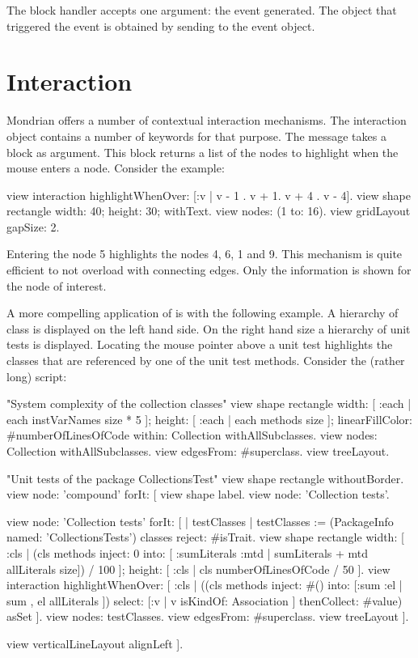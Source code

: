 \documentclass[a4paper,10pt,twoside]{book}
\begin{document}
The block handler accepts one argument: the event generated. The object that triggered the event is obtained by sending  to the event object. 


\section{Interaction}
Mondrian offers a number of contextual interaction mechanisms. The interaction object contains a number of keywords for that purpose. The message  takes a block as argument. This block returns a list of the nodes to highlight when the mouse enters a node. Consider the example:

\begin{code}{}
view interaction 
  highlightWhenOver: [:v | {v - 1 . v + 1. v + 4 . v - 4}].
view shape rectangle 
  width: 40;
  height: 30;
  withText.
view nodes: (1 to: 16).
view gridLayout gapSize: 2.
\end{code}

Entering the node 5 highlights the nodes 4, 6, 1 and 9. This mechanism is quite efficient to not overload with connecting edges. Only the information is shown for the node of interest. 

A more compelling application of  is with the following example. A hierarchy of class is displayed on the left hand side. On the right hand size a hierarchy of unit tests is displayed. Locating the mouse pointer above a unit test highlights the classes that are referenced by one of the unit test methods. Consider the (rather long) script:

\begin{code}{}
"System complexity of the collection classes"
view shape rectangle
  width: [ :each | each instVarNames size * 5 ];
  height: [ :each | each methods size ];
  linearFillColor: #numberOfLinesOfCode within: Collection withAllSubclasses.
view nodes: Collection withAllSubclasses.
view edgesFrom: #superclass.
view treeLayout.

"Unit tests of the package CollectionsTest"
view shape rectangle withoutBorder.
view node: 'compound' forIt: [
  view shape label.
  view node: 'Collection tests'.
  
  view node: 'Collection tests' forIt: [
    | testClasses |
    testClasses := (PackageInfo named: 'CollectionsTests') classes reject: #isTrait.
    view shape rectangle
      width: [ :cls | (cls methods inject: 0 into: [ :sumLiterals :mtd | sumLiterals + mtd allLiterals size]) / 100 ];
      height: [ :cls | cls numberOfLinesOfCode / 50 ].
    view interaction 
        highlightWhenOver: [ :cls | ((cls methods inject: #() 
                        into: [:sum :el | sum , el allLiterals ]) select: [:v | v isKindOf: Association ] thenCollect: #value) asSet ].
    view nodes: testClasses.
    view edgesFrom: #superclass.
    view treeLayout ].
  
  view verticalLineLayout alignLeft
].
\end{code}
\end{document}
